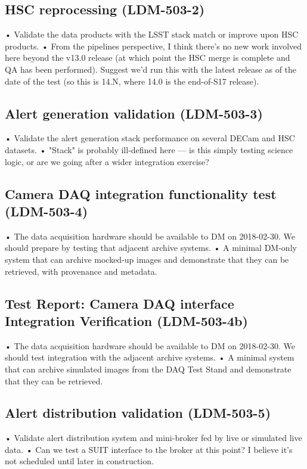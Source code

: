 \subsection{ HSC reprocessing \textbf{(LDM-503-2)}\label{LDM-503-2}}
• Validate the data products with the LSST stack match or improve upon HSC products.
 \newline• From the pipelines perspective, I think there's no new work involved here beyond the v13.0 release (at which point the HSC merge is complete and QA has been performed). Suggest we'd run this with the latest release as of the date of the test (so this is 14.N, where 14.0 is the end-of-S17 release).
\subsection{ Alert generation validation \textbf{(LDM-503-3)}\label{LDM-503-3}}
• Validate the alert generation stack performance on several DECam and HSC datasets.
 \newline• "Stack" is probably ill-defined here — is this simply testing science logic, or are we going after a wider integration exercise?
\subsection{ Camera DAQ integration functionality test \textbf{(LDM-503-4)}\label{LDM-503-4}}
• The data acquisition hardware should be available to DM on 2018-02-30. We should prepare by testing that adjacent archive systems.
 \newline• A minimal DM-only system that can archive mocked-up images and demonstrate that they can be retrieved, with provenance and metadata.
\subsection{Test Report: Camera DAQ interface Integration Verification \textbf{(LDM-503-4b)}\label{LDM-503-4b}}
• The data acquisition hardware should be available to DM on 2018-02-30. We should test integration with the adjacent archive systems.
 \newline• A minimal system that can archive simulated images from the DAQ Test Stand and demonstrate that they can be retrieved.
\subsection{ Alert distribution validation \textbf{(LDM-503-5)}\label{LDM-503-5}}
• Validate alert distribution system and mini-broker fed by live or simulated live data.
 \newline• Can we test a SUIT interface to the broker at this point? I believe it's not scheduled until later in construction.
